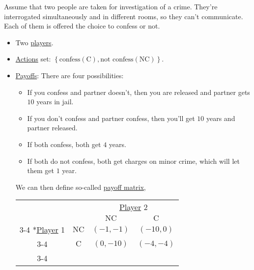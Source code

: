 \begin{eg}\label{eg:prisoner-dilemma}
	Assume that two people are taken for investigation of a crime. They're interrogated simultaneously and in different rooms, so they can't communicate. Each of them is offered the choice to confess or not.
	\begin{itemize}
		\item Two \hyperref[def:player]{players}.
		\item \hyperref[def:strategy]{Actions} set: \(\left\{\text{confess} (\mathrm{C}), \text{not confess} (\mathrm{NC})\right\}\).
		\item \hyperref[def:reward]{Payoffs}: There are four possibilities:
		      \begin{itemize}
			      \item If you confess and partner doesn't, then you are released and partner gets \(10\) years in jail.
			      \item If you don't confess and partner confess, then you'll get \(10\) years and partner released.
			      \item If both confess, both get \(4\) years.
			      \item If both do not confess, both get charges on minor crime, which will let them get \(1\) year.
		      \end{itemize}
		      We can then define so-called \hyperref[def:payoff-matrix]{payoff matrix},
		      \begin{table}[H]
			      \centering
			      \setlength{\extrarowheight}{2pt}
			      \begin{tabular}{cc|c|c|}
				                                                     & \multicolumn{1}{c}{} & \multicolumn{2}{c}{\hyperref[def:player]{Player} 2}                                    \\
				                                                     & \multicolumn{1}{c}{} & \multicolumn{1}{c}{$\mathrm{NC}$}                   & \multicolumn{1}{c}{$\mathrm{C}$} \\\cline{3-4}
				      \multirow{2}*{\hyperref[def:player]{Player} 1} & $\mathrm{NC}$        & $(-1, -1)$                                          & $(-10, 0)$                       \\\cline{3-4}
				                                                     & $\mathrm{C}$         & $(0, -10)$                                          & $(-4, -4)$                       \\\cline{3-4}
			      \end{tabular}

\end{table}
\end{itemize}
\end{eg}
